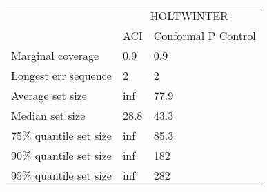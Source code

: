 \begin{tabular}{lll}
\toprule
& \multicolumn{2}{c}{HOLTWINTER} \\
& ACI & Conformal P Control \\
\midrule
Marginal coverage & 0.9 & 0.9 \\
Longest err sequence & 2 & 2 \\
Average set size & inf & 77.9 \\
Median set size & 28.8 & 43.3 \\
75\% quantile set size & inf & 85.3 \\
90\% quantile set size & inf & 182 \\
95\% quantile set size & inf & 282 \\
\bottomrule
\end{tabular}
